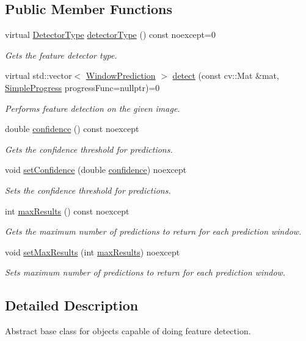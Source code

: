 \subsection*{Public Member Functions}
\begin{DoxyCompactItemize}
\item 
virtual \hyperlink{group___classification_module_ga9fa0b4fe3495e513c3c0746aa0940f41}{Detector\+Type} \hyperlink{group___classification_module_ga6f82560e3b0c2886e919f2e76e766838}{detector\+Type} () const noexcept=0
\begin{DoxyCompactList}\small\item\em Gets the feature detector type. \end{DoxyCompactList}\item 
virtual std\+::vector$<$ \hyperlink{structdg_1_1deepcore_1_1classification_1_1_window_prediction}{Window\+Prediction} $>$ \hyperlink{group___classification_module_gac09a9197de6732069e40b0e3bcbdf94c}{detect} (const cv\+::\+Mat \&mat, \hyperlink{group___utility_module_ga6763018df79e4bdbcd8cd14cea5342b2}{Simple\+Progress} progress\+Func=nullptr)=0
\begin{DoxyCompactList}\small\item\em Performs feature detection on the given image. \end{DoxyCompactList}\item 
double \hyperlink{group___classification_module_ga11004d28f6b88023d1ae1bed44261dc9}{confidence} () const noexcept
\begin{DoxyCompactList}\small\item\em Gets the confidence threshold for predictions. \end{DoxyCompactList}\item 
void \hyperlink{group___classification_module_ga870a49fe3273eacfea12e38aa8360f6f}{set\+Confidence} (double \hyperlink{group___classification_module_ga11004d28f6b88023d1ae1bed44261dc9}{confidence}) noexcept
\begin{DoxyCompactList}\small\item\em Sets the confidence threshold for predictions. \end{DoxyCompactList}\item 
int \hyperlink{group___classification_module_gae2a1d191924996f7d3d0673b8c2da35d}{max\+Results} () const noexcept
\begin{DoxyCompactList}\small\item\em Gets the maximum number of predictions to return for each prediction window. \end{DoxyCompactList}\item 
void \hyperlink{group___classification_module_ga936252ea1133d7c0c2a42ba0afbc2cf0}{set\+Max\+Results} (int \hyperlink{group___classification_module_gae2a1d191924996f7d3d0673b8c2da35d}{max\+Results}) noexcept
\begin{DoxyCompactList}\small\item\em Sets maximum number of predictions to return for each prediction window. \end{DoxyCompactList}\end{DoxyCompactItemize}


\subsection{Detailed Description}
Abstract base class for objects capable of doing feature detection. 